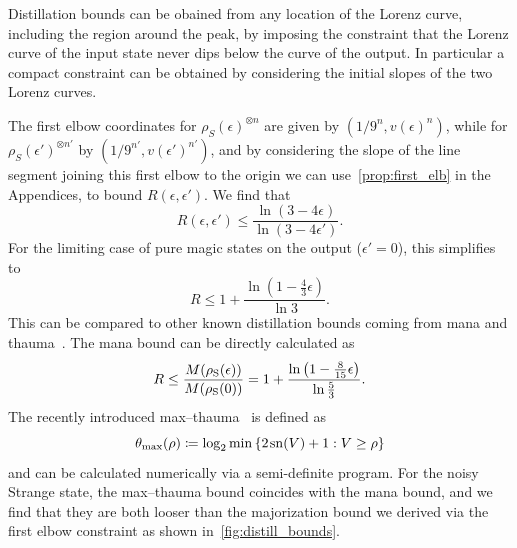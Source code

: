 \documentclass[pra,
aps,
twocolumn,
superscriptaddress,
groupedaddress,
nofootinbib,
reprint
]{revtex4-1}
\begin{document}
Distillation bounds can be obained from any location of the Lorenz curve, including the region around the peak, by imposing the constraint that the Lorenz curve of the input state never dips below the curve of the output. In particular a compact constraint can be obtained by considering the initial slopes of the two Lorenz curves. 

The first elbow coordinates for $\rho_S(\epsilon)^{\otimes n}$ are given by $(1/9^n, v(\epsilon)^n)$, while for $\rho_S(\epsilon')^{\otimes n'}$ by $(1/9^{n'}, v(\epsilon')^{n'})$, and by considering the slope of the line segment joining this first elbow to the origin we can use~\cref{prop:first_elb} in the Appendices, to bound $R(\epsilon, \epsilon')$. We find that
\begin{equation}
	R(\epsilon, \epsilon') \leq \frac{\ln (3-4\epsilon)}{\ln (3-4\epsilon')}.
\end{equation}
For the limiting case of pure magic states on the output ($\epsilon'=0$), this simplifies to
\begin{equation}
	R \leq 1 + \frac{\ln (1 - \frac{4}{3} \epsilon)}{\ln 3}.
\end{equation}
This can be compared to other known distillation bounds coming from mana and thauma~\cite{Wang_2020}. The mana bound can be directly calculated as
\begin{equation}
	R \leq \frac{{M(\rho_{\rm{S}}(\epsilon))}}{{M(\rho_{\rm{S}}(0))}} = 1 + \frac{\ln \left(1 - \frac{8}{15}\epsilon \right)}{\ln \frac{5}{3}}.
\end{equation}
The recently introduced max--thauma~\cite{Wang_2020} is defined as
\begin{equation}
	\theta_{\rm{max}}(\rho) \coloneqq \log_2{\min{\{2\hspace{1pt} {{\rm{sn}}(V)} +1 : V \geq \rho\}}}
\end{equation}
and can be calculated numerically via a semi-definite program. For the noisy Strange state, the max--thauma bound coincides with the mana bound, and we find that they are both looser than the majorization bound we derived via the first elbow constraint as shown in~\cref{fig:distill_bounds}. 
\end{document}
